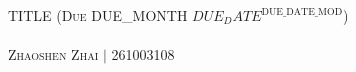 \documentclass{article}
\begin{document}
    \begin{center}
        \large{\textsc{TITLE (Due DUE_MONTH $DUE_DATE^\textrm{DUE_DATE_MOD}$)}}\\\ \\
        \normalsize{\textsc{Zhaoshen Zhai $|$ 261003108}}
    \end{center}

    \begin{question}
        
    \end{question}
    \begin{solution}
        \TODO
    \end{solution}
\end{document}
